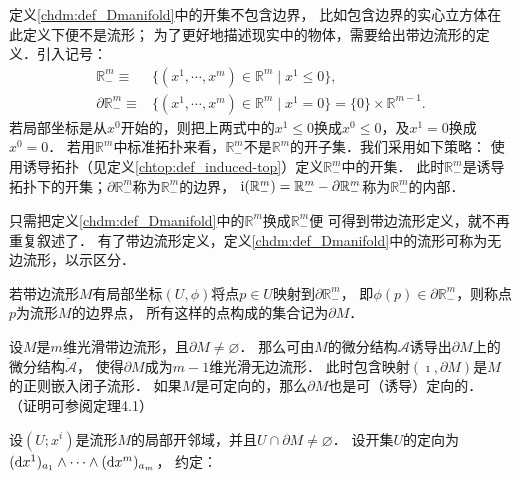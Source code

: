 定义\ref{chdm:def_Dmanifold}中的开集不包含边界，
比如包含边界的实心立方体在此定义下便不是流形；
为了更好地描述现实中的物体，需要给出带边流形的定义．引入记号：
\begin{align}
    \mathbb{R}^m_{-} \equiv & \{(x^1,\cdots,x^m)\in \mathbb{R}^m \mid x^1 \leqslant 0 \}, \label{chdf:eqn_Rn-} \\
    \partial \mathbb{R}^m_{-} \equiv &\{(x^1,\cdots,x^m)\in \mathbb{R}^m \mid x^1 = 0 \}
    = \{0\} \times \mathbb{R}^{m-1}  . \label{chdf:eqn_pRn+}
\end{align}
若局部坐标是从$x^0$开始的，则把上两式中的$x^1 \leqslant 0$换成$x^0 \leqslant 0$，及$x^1 = 0$换成$x^0 = 0$．
若用$\mathbb{R}^m$中标准拓扑来看，$\mathbb{R}^m_{-}$不是$\mathbb{R}^m$的开子集．我们采用如下策略：
使用诱导拓扑（见定义\ref{chtop:def_induced-top}）定义$\mathbb{R}^m_{-}$中的开集．
此时$\mathbb{R}^m_{-}$是诱导拓扑下的开集；$\partial \mathbb{R}^m_{-}$称为$\mathbb{R}^m_{-}$的{\heiti 边界}，
${\rm i}(\mathbb{R}^m_{-})=\mathbb{R}^m_{-}- \partial \mathbb{R}^m_{-}$称为$\mathbb{R}^m_{-}$的{\heiti 内部}．

\begin{definition}
    只需把定义\ref{chdm:def_Dmanifold}中的$\mathbb{R}^m$换成$\mathbb{R}^m_{-}$便
    可得到{\heiti 带边流形}定义，就不再重复叙述了．
    有了带边流形定义，定义\ref{chdm:def_Dmanifold}中的流形可称为无边流形，以示区分．
\end{definition}


若带边流形$M$有局部坐标$(U,\phi)$将点$p\in U$映射到$\partial \mathbb{R}^m_{-}$，
即$\phi(p)\in \partial \mathbb{R}^m_{-}$，则称点$p$为流形$M$的{\heiti 边界点}，
所有这样的点构成的集合记为$\partial M$．

\begin{theorem}\label{chdf:thm_induced-orientation}
    设$M$是$m$维光滑带边流形，且$\partial M\neq \varnothing$．
    那么可由$M$的微分结构$\mathscr{A}$诱导出$\partial M$上的微分结构$\widetilde{\mathscr{A}}$，
    使得$\partial M$成为$m-1$维光滑无边流形．
    此时包含映射$(\imath,\partial M)$是$M$的正则嵌入闭子流形．
    如果$M$是可定向的，那么$\partial M$也是可（诱导）定向的．
    （证明可参阅\parencite[\S3.4]{cc2001-zh}定理4.1）
\end{theorem}

设$(U;x^i)$是流形$M$的局部开邻域，并且$U\cap \partial M \neq \varnothing$．
设开集$U$的定向为$ ({\rm d}x^1)_{a_1} \wedge \cdots\wedge({\rm d}x^{m})_{a_{m}}$，
{\heiti 约定}：

